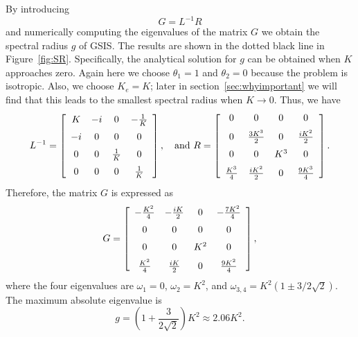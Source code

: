 By introducing 
\begin{equation}\label{gsis_Matrix_G}
G=L^{-1}R
\end{equation}
and numerically computing the eigenvalues of the matrix $G$ we obtain the spectral radius ${g}$ of GSIS. The results are shown in the dotted black line in Figure~\ref{fig:SR}. 
Specifically, the analytical solution for $g$ can be obtained when $K$ approaches zero. Again here we choose $\theta_1=1$ and $\theta_2=0$ because the problem is isotropic. Also, we choose $K_e=K$; later in section~\ref{sec:whyimportant} we will find that this leads to the smallest spectral radius when $K\rightarrow0$. Thus, we have
\begin{equation*}\label{GSIS_taylor_invL}
L^{-1}=\left[ \begin {array}{cccccc} 
K & -i & 0 & -\frac{1}{K}
\\ \noalign{\medskip}
-i & 0 & 0 & 0
\\ \noalign{\medskip}
0 & 0 & \frac{1}{K} & 0
\\ \noalign{\medskip}
0 & 0 & 0 & \frac{1}{K}
\end {array} \right], \quad \text{and~}
R=\left[ \begin {array}{cccccc} 
0 & 0 & 0 & 0
\\ \noalign{\medskip}
0 & \frac{3K^3}{2}& 0 & \frac{iK^2}{2}
\\ \noalign{\medskip}
0 & 0 & K^3 & 0
\\ \noalign{\medskip}
\frac{K^3}{4} & \frac{iK^2}{2} & 0 & \frac{9K^3}{4}
\end {array} \right].
\end{equation*}
Therefore, the matrix $G$ is expressed as
\begin{equation}\label{GSIS_taylor_G}
G=\left[ \begin {array}{cccccc} 
-\frac{K^2}{4} & -\frac{iK}{2} & 0 & -\frac{7K^2}{4}
\\ \noalign{\medskip}
0 & 0 & 0 & 0
\\ \noalign{\medskip}
0 & 0 & K^2 & 0
\\ \noalign{\medskip}
\frac{K^2}{4} & \frac{iK}{2} & 0 & \frac{9K^2}{4}
\end {array} \right],
\end{equation}	
where the four eigenvalues are $\omega_1=0$, $\omega_2=K^2$, and $\omega_{3,4}=K^2(1\pm3/2\sqrt{2})$. The maximum absolute eigenvalue is
\begin{equation}\label{analytical_gsis_max}
{g}=\left(1+\frac{3}{2\sqrt{2}}\right)K^2\approx2.06K^2.
\end{equation}
